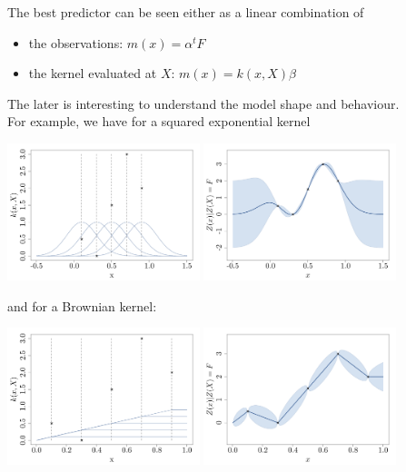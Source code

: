 \documentclass{beamer}
\begin{document}
\begin{frame}{}
The best predictor can be seen either as a linear combination of
\begin{itemize}
	\item the observations: $m(x)=\alpha^t F$
	\item the kernel evaluated at $X$: $m(x)=k(x,X) \beta$
\end{itemize} 
The later is interesting to understand the model shape and behaviour. \\
\vspace{5mm}
For example, we have for a squared exponential kernel
\begin{center}
\includegraphics[height=4cm]{figures/R/ch34_basisfuncGauss}  
\includegraphics[height=4cm]{figures/R/ch34_GPRbasisfuncGauss} 
\end{center}
\end{frame}

\begin{frame}{}
and for a Brownian kernel:
\begin{center}
\includegraphics[height=4cm]{figures/R/ch34_basisfuncBrown}
\includegraphics[height=4cm]{figures/R/ch34_GPRbasisfuncBrown}
\end{center}
\end{frame}
\end{document}

